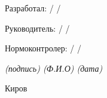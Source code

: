 \begin{titlepage}
	\newcommand{\ulinesize}{2.5cm}

	\large
	\vspace{1cm}
	\noindent
	Разработал: \studentgroup \hfill \uline{\hspace{\ulinesize}}
	/ \uline{\authorwithinitials} / \hspace{8mm} \uline{\hspace{\ulinesize}}

	\vspace{1.5cm}
	\noindent
	Руководитель: \supervisorrank
	\hfill \uline{\hspace{\ulinesize}}
	/ \uline{\supervisor} / \uline{\hspace{\ulinesize}}

	\vspace{1.5cm}
	\noindent
	Нормоконтролер: \norminspectorrank
	\hfill \uline{\hspace{\ulinesize}}
	/ \uline{\norminspector} / \hspace{4mm} \uline{\hspace{\ulinesize}}

	{
		\small
		\itshape
		\hfill
		(подпись) \hspace{1.6cm} (Ф.И.О) \hspace{2.2cm} (дата) \hspace{0.8cm}
	}

	\begin{center}
		\vfill
		Киров \the\year
		\vspace{1cm}
	\end{center}


\end{titlepage}
